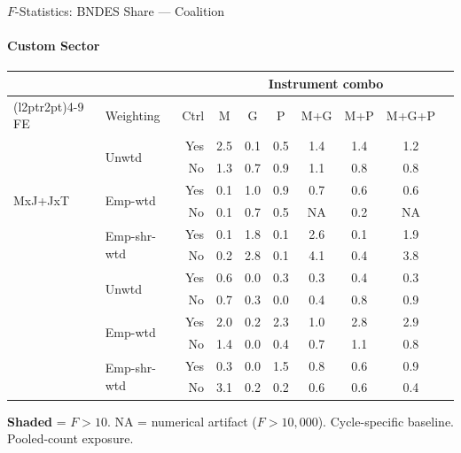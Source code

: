 \documentclass[aspectratio=169,10pt]{beamer}
\begin{document}
\begin{frame}[t]{$F$-Statistics: BNDES Share --- Coalition}
\framesubtitle{Custom Sector}
\begin{center}
\footnotesize
\setlength{\tabcolsep}{3.5pt}
\renewcommand{\arraystretch}{1.05}
\begin{tabular}{@{}llrccccccc@{}}
\toprule
 & & & \multicolumn{6}{c}{Instrument combo} \\
\cmidrule(l{2pt}r{2pt}){4-9}
FE & Weighting & Ctrl & M & G & P & M+G & M+P & M+G+P \\
\midrule
  \multirow{6}{*}{MxJ+JxT} & \multirow{2}{*}{Unwtd} & Yes & 2.5 & 0.1 & 0.5 & 1.4 & 1.4 & 1.2 \\
   &  & No & 1.3 & 0.7 & 0.9 & 1.1 & 0.8 & 0.8 \\
   & \multirow{2}{*}{Emp-wtd} & Yes & 0.1 & 1.0 & 0.9 & 0.7 & 0.6 & 0.6 \\
   &  & No & 0.1 & 0.7 & 0.5 & NA & 0.2 & NA \\
   & \multirow{2}{*}{Emp-shr-wtd} & Yes & 0.1 & 1.8 & 0.1 & 2.6 & 0.1 & 1.9 \\
   &  & No & 0.2 & 2.8 & 0.1 & 4.1 & 0.4 & 3.8 \\
\addlinespace[5pt]
  \multirow{6}{*}{MxJ+MxT} & \multirow{2}{*}{Unwtd} & Yes & 0.6 & 0.0 & 0.3 & 0.3 & 0.4 & 0.3 \\
   &  & No & 0.7 & 0.3 & 0.0 & 0.4 & 0.8 & 0.9 \\
   & \multirow{2}{*}{Emp-wtd} & Yes & 2.0 & 0.2 & 2.3 & 1.0 & 2.8 & 2.9 \\
   &  & No & 1.4 & 0.0 & 0.4 & 0.7 & 1.1 & 0.8 \\
   & \multirow{2}{*}{Emp-shr-wtd} & Yes & 0.3 & 0.0 & 1.5 & 0.8 & 0.6 & 0.9 \\
   &  & No & 3.1 & 0.2 & 0.2 & 0.6 & 0.6 & 0.4 \\
\bottomrule
\end{tabular}
\end{center}
{\scriptsize \colorbox{pass}{\textbf{Shaded}} = $F>10$. NA = numerical artifact ($F>10{,}000$). Cycle-specific baseline. Pooled-count exposure.}
\end{frame}
\end{document}
